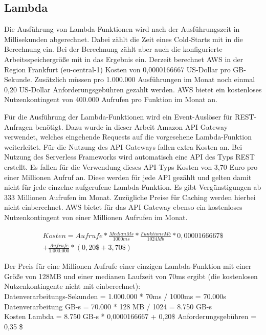 \subsection{Lambda}
Die Ausführung von Lambda-Funktionen wird nach der Ausführungszeit in Millisekunden abgerechnet. Dabei zählt die Zeit eines Cold-Starts mit in die Berechnung ein. Bei der Berechnung zählt aber auch die konfigurierte Arbeitsspeichergröße mit in das Ergebnis ein. Derzeit berechnet AWS in der Region Frankfurt (eu-central-1) Kosten von 0,0000166667 US-Dollar pro GB-Sekunde\cite{noauthor_lambda_nodate}. Zusätzlich müssen pro 1.000.000 Ausführungen im Monat noch einmal 0,20 US-Dollar Anforderungsgebühren gezahlt werden. AWS bietet ein kostenloses Nutzenkontingent von 400.000 Aufrufen pro Funktion im Monat an.

Für die Ausführung der Lambda-Funktionen wird ein Event-Auslöser für REST-Anfragen benötigt. Dazu wurde in dieser Arbeit Amazon API Gateway verwendet, welches eingehende Requests auf die vorgesehene Lambda-Funktion weiterleitet. Für die Nutzung des API Gateways fallen extra Kosten an. Bei Nutzung des Serverless Frameworks wird automatisch eine API des Typs REST erstellt. Es fallen für die Verwendung dieses API-Typs Kosten von 3,70 Euro pro einer Millionen Aufruf an. Diese werden für jede API gezählt und gelten damit nicht für jede einzelne aufgerufene Lambda-Funktion. Es gibt Vergünstigungen ab 333 Millionen Aufrufen im Monat. Zuzügliche Preise für Caching werden hierbei nicht einberechnet. AWS bietet für das API Gateway ebenso ein kostenloses Nutzenkontingent von einer Millionen Aufrufen im Monat\cite{noauthor_amazon_nodate}.

\begin{equation}
\begin{split}
Kosten = Aufrufe * \frac{MedianMs}{1000ms} * \frac{FunktionsMb}{1024Mb} * 0,0000166667\$ \\
+ \frac{Aufrufe}{1.000.000} * (0,20\$ + 3,70\$)
\end{split}
\end{equation}

Der Preis für eine Millionen Aufrufe einer einzigen Lambda-Funktion mit einer Größe von 128MB und einer medianen Laufzeit von 70ms ergibt (die kostenlosen Nutzenkontingente nicht mit einberechnet): \\

Datenverarbeitungs-Sekunden = 1.000.000 * 70ms / 1000ms = 70.000s   \\
Datenverarbeitung GB-s = 70.000 * 128 MB / 1024 = 8.750 GB-s    \\
Kosten Lambda = 8.750 GB-s * 0,0000166667 + 0,20\$ Anforderungsgebühren = 0,35 \$     \\

